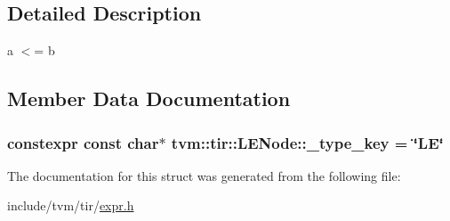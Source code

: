 \subsection{Detailed Description}
a $<$= b 

\subsection{Member Data Documentation}
\subsubsection[{\texorpdfstring{\+\_\+type\+\_\+key}{_type_key}}]{\setlength{\rightskip}{0pt plus 5cm}constexpr const char$\ast$ tvm\+::tir\+::\+L\+E\+Node\+::\+\_\+type\+\_\+key = \char`\"{}LE\char`\"{}\hspace{0.3cm}{\ttfamily [static]}}\hypertarget{structtvm_1_1tir_1_1LENode_a909407e7db707f867951ae12841d63d7}{}\label{structtvm_1_1tir_1_1LENode_a909407e7db707f867951ae12841d63d7}


The documentation for this struct was generated from the following file\+:\begin{DoxyCompactItemize}
\item 
include/tvm/tir/\hyperlink{tir_2expr_8h}{expr.\+h}\end{DoxyCompactItemize}

